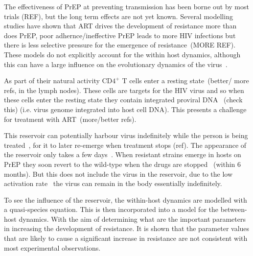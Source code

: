 \documentclass[DIV=15]{scrartcl}
\begin{document}
 The effectiveness of PrEP at preventing transmission has been borne out by most trials  (REF), but the long term effects are not yet known. Several  modelling studies have shown that  ART drives the development of resistance more than does PrEP, poor adhernce/ineffective PrEP leads to more HIV infections but there is less  selective pressure for the emergence of  resistance~\cite{abbas2013}(MORE REF). These models do not explicitly account for the within host dynamics, although this can have a large influence on the evolutionary dynamics of the virus~\cite{lythgoe2013}.   
 
  As part of their natural activity CD$4^+$ T  cells enter a resting state~\cite{bukrinsky1991}(better/ more refs, in the lymph nodes). These cells are targets for the HIV virus and so when these cells enter the resting state they contain integrated  proviral  DNA~ \cite{chun1997,finzi1997}(check this) (i.e. virus genome integrated into host cell DNA).  This presents a challenge for treatment with ART~\cite{chun2015}(more/better refs). 


This reservoir can potentially harbour virus indefinitely while the person is being treated~\cite{siliciano2003,crooks2015}, for  it to later re-emerge when treatment stops (ref). The appearance of the reservoir   only takes a few days~\cite{sompayrac2011}. 
When resistant strains emerge in hosts on PrEP they soon revert to the wild-type  when the drugs are stopped~\cite{weis2016} (within 6 months). But this  does not include the virus in the reservoir, due to the  low activation rate~\cite{finzi1999} the virus can remain in the body essentially indefinitely.










To see the influence of  the reservoir, the within-host dynamics are modelled with a quasi-species equation. This is then incorporated into a model for the between-host dynamics. With the aim of determining what are the important parameters in increasing the development of resistance. It is shown that the parameter values  that are likely to cause a significant increase in resistance are not consistent with most experimental observations.
\end{document}

